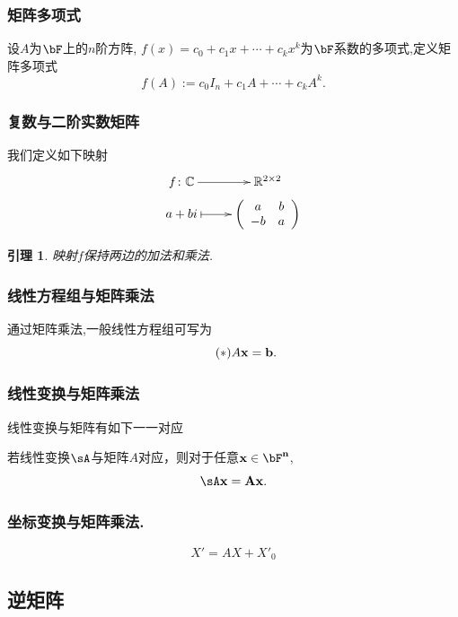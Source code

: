 \documentclass{article}
\newtheorem{lemma}[theorem]{引理}
\begin{document}
\subsubsection{矩阵多项式}
设$A$为$\bF$上的$n$阶方阵, $f(x)=c_0+c_1x+\cdots+c_kx^k$为$\bF$系数的多项式,定义矩阵多项式
\[f(A):=c_0I_n + c_1A+\cdots+c_kA^k.\]

\subsubsection{复数与二阶实数矩阵}
我们定义如下映射
\begin{equation*}
\xymatrix@R=1mm{
f\colon \mathbb C \ar[r]& \mathbb R^{2\times 2} \\
a+bi \ar@{|->}[r] & {\left(\begin{array}{cc}a&b\\-b&a\\\end{array}\right)} \\
}
\end{equation*}
\begin{lemma}
映射$f$保持两边的加法和乘法.
\end{lemma}

\subsubsection{线性方程组与矩阵乘法}
通过矩阵乘法,一般线性方程组可写为
\begin{equation}\label{system_of_linear_equations}\tag{$*$}
A\bf x=\bf b.
\end{equation}

\subsubsection{线性变换与矩阵乘法}
线性变换与矩阵有如下一一对应
\begin{center}
\end{center}
若线性变换$\sA$与矩阵$A$对应，则对于任意$\bf x \in \bF^n$,
\[\sA \bf x = A\bf x.\]

\subsubsection{坐标变换与矩阵乘法.}
\[X' = AX+X'_0\]


\subsection{逆矩阵}
\end{document}
